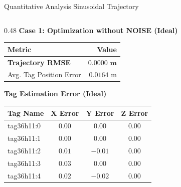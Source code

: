 \begin{frame}{Quantitative Analysis Sinusoidal Trajectory}
    \centering
    \footnotesize %

    \begin{columns}[T] %

        \begin{column}{0.48\textwidth}
            \centering
            \textbf{Case 1: Optimization without NOISE (Ideal)}
            \vspace{0.1cm}

            \begin{tabular}{lr}
                \toprule
                \textbf{Metric} & \textbf{Value} \\
                \midrule
                \textbf{Trajectory RMSE} & $\mathbf{0.0000 \text{ m}}$ \\ %
                Avg. Tag Position Error & $0.0164 \text{ m}$ \\
                \bottomrule
            \end{tabular}

            \vspace{0.3cm}
            
            \textbf{Tag Estimation Error (Ideal)}
            \begin{tabular}{lccc}
                \toprule
                \textbf{Tag Name} & $\mathbf{X}$ \textbf{Error} & $\mathbf{Y}$ \textbf{Error} & $\mathbf{Z}$ \textbf{Error} \\
                \midrule
                tag36h11:0 & $0.00$ & $0.00$ & $0.00$ \\
                tag36h11:1 & $0.00$ & $0.00$ & $0.00$ \\
                tag36h11:2 & $0.01$ & $-0.01$ & $0.00$ \\
                tag36h11:3 & $0.03$ & $0.00$ & $0.00$ \\
                tag36h11:4 & $0.02$ & $-0.02$ & $0.00$ \\
                \bottomrule
            \end{tabular}
        \end{column}


\end{columns}
\end{frame}
